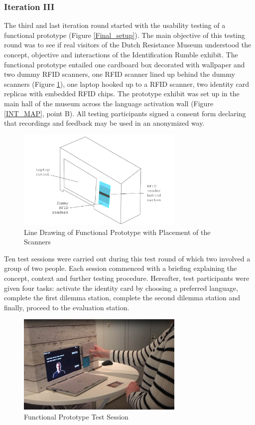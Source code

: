 \subsubsection{Iteration III}
The third and last iteration round started with the usability testing of a functional prototype (Figure \ref{Final_setup}). The main objective of this testing round was to see if real visitors of the Dutch Resistance Museum understood the concept, objective and interactions of the Identification Rumble exhibit. The functional prototype entailed one cardboard box decorated with wallpaper and two dummy RFID scanners, one RFID scanner lined up behind the dummy scanners (Figure \ref{Box_Draw}), one laptop hooked up to a RFID scanner, two identity card replicas with embedded RFID chips. The prototype exhibit was set up in the main hall of the museum across the language activation wall (Figure \ref{INT_MAP}, point B). All testing participants signed a consent form declaring that recordings and feedback may be used in an anonymized way.

\begin{figure} [h]
\includegraphics[width=8cm]{assets/box_draw.jpg}
\caption{Line Drawing of Functional Prototype with Placement of the Scanners}
\centering
\label{Box_Draw}
\end{figure}

Ten test sessions were carried out during this test round of which two involved a group of two people. Each session commenced with a briefing explaining the concept, context and further testing procedure. Hereafter, test participants were given four tasks: activate the identity card by choosing a preferred language, complete the first dilemma station, complete the second dilemma station and finally, proceed to the evaluation station.

\begin{figure} [h]
\includegraphics[width=8cm]{assets/test_final1.jpg}
\caption{Functional Prototype Test Session}
\centering
\label{Final_fi}
\end{figure}

